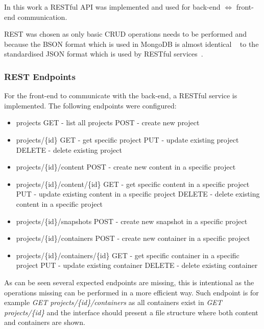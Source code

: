 \documentclass[a4paper,12pt]{article}
\newcounter{subsubsubsection}[subsubsection]
\newcommand{\Iff}{\Leftrightarrow}
\begin{document}
\label{sec:API}
In this work a RESTful API was implemented and used for back-end $\Iff$ front-end
communication.

REST was chosen as only basic CRUD operations needs to be performed and because the BSON format
which is used in MongoDB is almost identical ~\cite{BSON} to the standardised JSON format which is
used by RESTful services~\cite{JSON}. 

\subsubsection{REST Endpoints}
For the front-end to communicate with the back-end, a RESTful service is implemented.
The following endpoints were configured:

\begin{itemize}
  \item projects
      \subitem GET - list all projects
      \subitem POST - create new project
  \item projects/\{id\}
      \subitem GET - get specific project
      \subitem PUT - update existing project
      \subitem DELETE - delete existing project
  \item projects/\{id\}/content
      \subitem POST - create new content in a specific project 
  \item projects/\{id\}/content/\{id\}
      \subitem GET - get specific content in a specific project
      \subitem PUT - update existing content in a specific project
      \subitem DELETE - delete existing content in a specific project

  \item projects/\{id\}/snapshots
      \subitem POST - create new snapshot in a specific project 

  \item projects/\{id\}/containers
      \subitem POST - create new container in a specific project 
  \item projects/\{id\}/containers/\{id\}
      \subitem GET - get specific container in a specific project
      \subitem PUT - update existing container
      \subitem DELETE - delete existing container
\end{itemize}

As can be seen several expected endpoints are missing, this is intentional as the operations missing
can be performed in a more efficient way. Such endpoint is for example \textit{GET 
projects/\{id\}/containers} as all containers exist in \textit{GET projects/\{id\}} and the interface
should present a file structure where both content and containers are shown.
\end{document}
